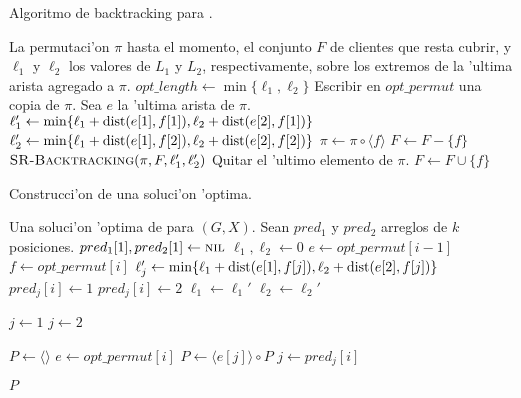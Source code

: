 \begin{algorithm}
  \caption{Algoritmo de backtracking para .}
  \label{al:backtracking}
  \begin{algorithmic}[1]
  	\Require La permutaci'on $\pi$ hasta el momento, el conjunto $F$ de clientes que resta cubrir, y $\ell_1$ y $\ell_2$ los valores de $L_1$ y $L_2$, respectivamente, sobre los extremos de la 'ultima arista agregado a $\pi$.
			\State $opt\_length \gets \min\{\ell_1, \ell_2\}$
			\State Escribir en $opt\_permut$ una copia de $\pi$.
		\EndIf		
		\Return
	\EndIf
	\State Sea $e$ la 'ultima arista de $\pi$.
		\State $\ell_1' \gets \min\{\ell_1 + \textnormal{dist}(e[1], f[1]), \ell_2 + \textnormal{dist}(e[2], f[1])\}$
		\State $\ell_2' \gets \min\{\ell_1 + \textnormal{dist}(e[1], f[2]), \ell_2 + \textnormal{dist}(e[2], f[2])\}$
		\State $\pi \gets \pi \circ \langle f \rangle$
		\State $F \gets F - \{f\}$
		\State $\textsc{SR-Backtracking}(\pi, F, \ell_1', \ell_2')$
		\State Quitar el 'ultimo elemento de $\pi$.
		\State $F \gets F \cup \{f\}$
	\EndFor
	\EndFunction
  \end{algorithmic}
\end{algorithm}

\begin{algorithm}
  \caption{Construcci'on de una soluci'on 'optima.}
  \label{al:build_path_backtracking}
  \begin{algorithmic}[1]
  	\Ensure Una soluci'on 'optima de  para $(G, X)$.
	\State Sean $pred_1$ y $pred_2$ arreglos de $k$ posiciones.
	\State $pred_1[1], pred_2[1] \gets \textsc{nil}$
	\State $\ell_1, \ell_2 \gets 0$
		\State $e \gets opt\_permut[i - 1]$
		\State $f \gets opt\_permut[i]$
			\State $\ell_j' \gets \min\{\ell_1 + \textnormal{dist}(e[1], f[j]), \ell_2 + \textnormal{dist}(e[2], f[j])\}$
				\State $pred_j[i] \gets 1$
			\Else
				\State $pred_j[i] \gets 2$ 
			\EndIf
		\EndFor
		\State $\ell_1 \gets \ell_1'$
		\State $\ell_2 \gets \ell_2'$
	\EndFor
	
		\State $j \gets 1$
	\Else
		\State $j \gets 2$
	\EndIf
	
	\State $P \gets \langle \rangle$
		\State $e \gets opt\_permut[i]$
		\State $P \gets \langle e[j] \rangle \circ P$
		\State $j \gets pred_j[i]$
	\EndFor

	\Return $P$
	\EndFunction
  \end{algorithmic}
\end{algorithm}

